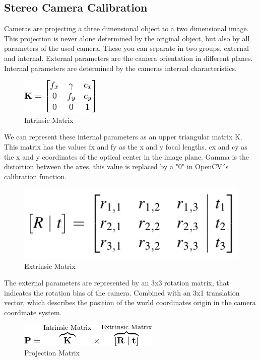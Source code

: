 \documentclass[journal,onecolumn]{IEEEtran}
\begin{document}
\subsection{Stereo Camera Calibration}
\noindent
Cameras are projecting a three dimensional object to a two dimensional image. This projection is never alone determined by the original object, but also by all parameters of the used camera. These you can separate in two groups, external and internal. External parameters are the camera orientation in different planes. Internal parameters are determined by the cameras internal characteristics.
\begin{figure}[H]
	\centering
	\includegraphics[scale=0.8]{intrinsicMatrix.png}
	\captionsetup{justification=centering}
	\caption{Intrinsic Matrix}
\end{figure}
\noindent
We can represent these internal parameters as an upper triangular matrix K. This matrix has the values fx and fy as the x and y focal lengths. cx and cy as the x and y coordinates of the optical center in the image plane. Gamma is the distortion between the axes, this value is replaced by a "0" in OpenCV´s calibration function.\newline
\begin{figure}[H]
	\centering
	\includegraphics[scale=0.4]{extrinsicMatrix.png}
	\captionsetup{justification=centering}
	\caption{Extrinsic Matrix}
\end{figure}
\noindent
The external parameters are represented by an 3x3 rotation matrix, that indicates the rotation bias of the camera. Combined with an 3x1 translation vector, which describes the position of the world coordinates origin in the camera coordinate system.\newline
\begin{figure}[H]
	\centering
	\includegraphics[scale=0.7]{projectionMatrix.png}
	\captionsetup{justification=centering}
	\caption{Projection Matrix}
\end{figure}
\end{document}

